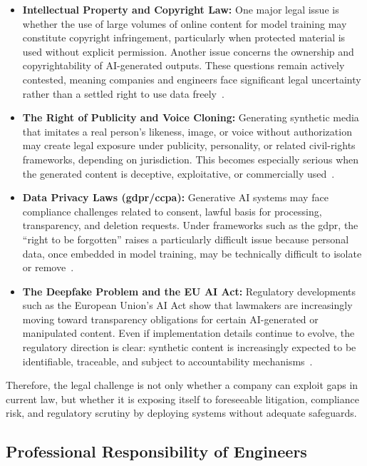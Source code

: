 \begin{itemize}
    \item \textbf{Intellectual Property and Copyright Law:} One major legal issue is whether the use of large volumes of online content for model training may constitute copyright infringement, particularly when protected material is used without explicit permission. Another issue concerns the ownership and copyrightability of AI-generated outputs. These questions remain actively contested, meaning companies and engineers face significant legal uncertainty rather than a settled right to use data freely~\cite{fair-use}.

    \item \textbf{The Right of Publicity and Voice Cloning:} Generating synthetic media that imitates a real person's likeness, image, or voice without authorization may create legal exposure under publicity, personality, or related civil-rights frameworks, depending on jurisdiction. This becomes especially serious when the generated content is deceptive, exploitative, or commercially used~\cite{juzonvoice}.

    \item \textbf{Data Privacy Laws (\acs{gdpr}/\acs{ccpa}):} Generative AI systems may face compliance challenges related to consent, lawful basis for processing, transparency, and deletion requests. Under frameworks such as the \ac{gdpr}, the ``right to be forgotten'' raises a particularly difficult issue because personal data, once embedded in model training, may be technically difficult to isolate or remove~\cite{gdpr}.

    \item \textbf{The Deepfake Problem and the EU AI Act:} Regulatory developments such as the European Union's AI Act show that lawmakers are increasingly moving toward transparency obligations for certain AI-generated or manipulated content. Even if implementation details continue to evolve, the regulatory direction is clear: synthetic content is increasingly expected to be identifiable, traceable, and subject to accountability mechanisms~\cite{eu-par}.
\end{itemize}

Therefore, the legal challenge is not only whether a company can exploit gaps in current law, but whether it is exposing itself to foreseeable litigation, compliance risk, and regulatory scrutiny by deploying systems without adequate safeguards.

\subsection{Professional Responsibility of Engineers}\label{sec:responsibility}

